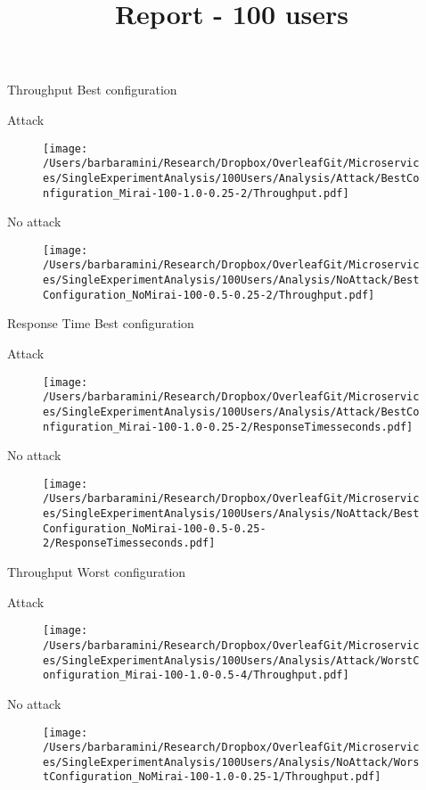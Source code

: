 \documentclass[10pt]{article}
\begin{document}
\title{Report - 100 users}
\maketitle
Throughput Best configuration \par
Attack \par
\begin{figure}[h]
\texttt{[image: /Users/barbaramini/Research/Dropbox/OverleafGit/Microservices/SingleExperimentAnalysis/100Users/Analysis/Attack/BestConfiguration\_Mirai-100-1.0-0.25-2/Throughput.pdf]}
\end{figure}
No attack 
\begin{figure}[h]
\texttt{[image: /Users/barbaramini/Research/Dropbox/OverleafGit/Microservices/SingleExperimentAnalysis/100Users/Analysis/NoAttack/BestConfiguration\_NoMirai-100-0.5-0.25-2/Throughput.pdf]}
\end{figure}

\break
Response Time Best configuration \par
Attack\par
\begin{figure}[h]
\texttt{[image: /Users/barbaramini/Research/Dropbox/OverleafGit/Microservices/SingleExperimentAnalysis/100Users/Analysis/Attack/BestConfiguration\_Mirai-100-1.0-0.25-2/ResponseTimesseconds.pdf]}
\end{figure}
No attack
\begin{figure}[h]
\texttt{[image: /Users/barbaramini/Research/Dropbox/OverleafGit/Microservices/SingleExperimentAnalysis/100Users/Analysis/NoAttack/BestConfiguration\_NoMirai-100-0.5-0.25-2/ResponseTimesseconds.pdf]}
\end{figure}

\break
Throughput Worst configuration \par
Attack 

\begin{figure}[h]
\texttt{[image: /Users/barbaramini/Research/Dropbox/OverleafGit/Microservices/SingleExperimentAnalysis/100Users/Analysis/Attack/WorstConfiguration\_Mirai-100-1.0-0.5-4/Throughput.pdf]}
\end{figure}

No attack
\begin{figure}[h]
\texttt{[image: /Users/barbaramini/Research/Dropbox/OverleafGit/Microservices/SingleExperimentAnalysis/100Users/Analysis/NoAttack/WorstConfiguration\_NoMirai-100-1.0-0.25-1/Throughput.pdf]}
\end{figure}
\end{document}
